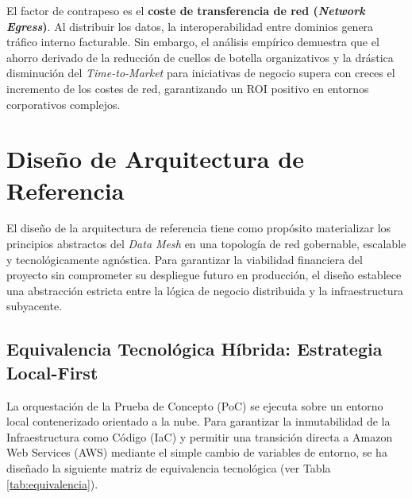 \documentclass[12pt, a4paper]{article}
\begin{document}
El factor de contrapeso es el \textbf{coste de transferencia de red (\textit{Network Egress})}. Al distribuir los datos, la interoperabilidad entre dominios genera tráfico interno facturable. Sin embargo, el análisis empírico demuestra que el ahorro derivado de la reducción de cuellos de botella organizativos y la drástica disminución del \textit{Time-to-Market} para iniciativas de negocio supera con creces el incremento de los costes de red, garantizando un ROI positivo en entornos corporativos complejos.

\section{Diseño de Arquitectura de Referencia}

El diseño de la arquitectura de referencia tiene como propósito materializar los principios abstractos del \textit{Data Mesh} en una topología de red gobernable, escalable y tecnológicamente agnóstica. Para garantizar la viabilidad financiera del proyecto sin comprometer su despliegue futuro en producción, el diseño establece una abstracción estricta entre la lógica de negocio distribuida y la infraestructura subyacente.

\subsection{Equivalencia Tecnológica Híbrida: Estrategia Local-First}

La orquestación de la Prueba de Concepto (PoC) se ejecuta sobre un entorno local contenerizado orientado a la nube. Para garantizar la inmutabilidad de la Infraestructura como Código (IaC) y permitir una transición directa a Amazon Web Services (AWS) mediante el simple cambio de variables de entorno, se ha diseñado la siguiente matriz de equivalencia tecnológica (ver Tabla \ref{tab:equivalencia}).

\newpage
\end{document}
